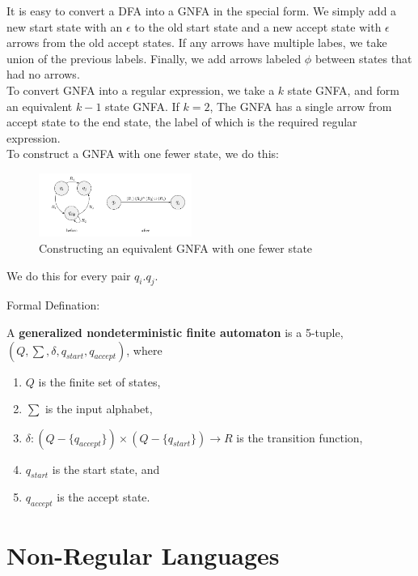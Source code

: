 It is easy to convert a DFA into a GNFA in the special form. We simply add a
new start state with an $\epsilon$ to the old start state and a new accept
state with $\epsilon$ arrows from the old accept states. If any arrows have
multiple labes, we take union of the previous labels. Finally, we add arrows
labeled $\phi$ between states that had no arrows.\\

To convert GNFA into a regular expression, we take a $k$ state GNFA, and form 
an equivalent $k - 1$ state GNFA. If $k = 2$, The GNFA has a single arrow
from accept state to the end state, the label of which is the required 
regular expression.\\

To construct a GNFA with one fewer state, we do this:

\begin{figure}[h!]
    \begin{center}
        \includegraphics[width=5cm]{img/163.png}
        \caption{Constructing an equivalent GNFA with one fewer state}
    \end{center}
\end{figure}

We do this for every pair $q_i. q_j$.

Formal Defination:

\begin{defination}
    A \textbf{generalized nondeterministic finite automaton} is a 5-tuple,
    $(Q, \sum, \delta, q_{start}, q_{accept})$, where
    \begin{enumerate}
        \item $Q$ is the finite set of states,
        \item $\sum$ is the input alphabet,
        \item $\delta: (Q - \{q_{accept}\}) \times (Q - \{q_{start}\}) 
            \rightarrow R$ is the transition function,
        \item $q_{start}$ is the start state, and
        \item $q_{accept}$ is the accept state.
    \end{enumerate}
\end{defination}

\section{Non-Regular Languages}
